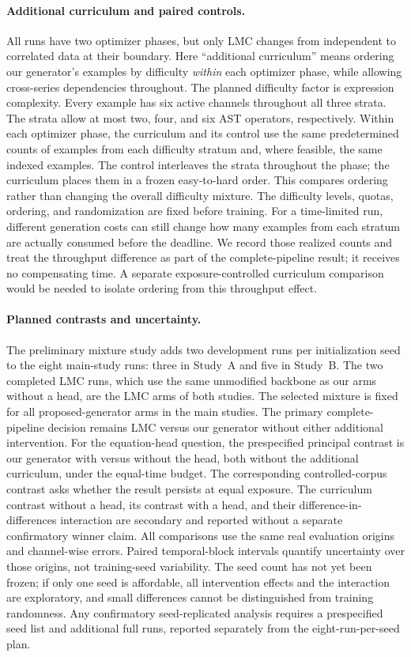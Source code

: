 \paragraph{Additional curriculum and paired controls.}
All runs have two optimizer phases, but only LMC changes from independent to
correlated data at their boundary. Here ``additional curriculum'' means
ordering our generator's examples by difficulty \emph{within} each optimizer
phase, while allowing cross-series dependencies throughout. The planned
difficulty factor is expression complexity. Every example has six active
channels throughout all three strata. The strata allow at most two, four,
and six AST operators, respectively.
Within each optimizer phase, the curriculum and its control use the same predetermined
counts of examples from each difficulty stratum and, where feasible, the same
indexed examples. The control interleaves the strata throughout the phase;
the curriculum places them in a frozen easy-to-hard order. This compares
ordering rather than changing the overall difficulty mixture. The difficulty
levels, quotas, ordering, and randomization are fixed before training.
For a time-limited run, different generation costs can still change how many
examples from each stratum are actually consumed before the deadline. We
record those realized counts and treat the throughput difference as part of
the complete-pipeline result; it receives no compensating time. A separate
exposure-controlled curriculum comparison would be needed to isolate ordering
from this throughput effect.

\paragraph{Planned contrasts and uncertainty.}
The preliminary mixture study adds two development runs per initialization
seed to the eight main-study runs: three in Study~A and five in Study~B. The
two completed LMC runs, which use the same unmodified backbone as our arms
without a head, are the LMC arms of both studies.
The selected mixture is fixed for all proposed-generator arms in the main
studies. The
primary complete-pipeline decision remains LMC versus our generator without
either additional intervention. For the equation-head question, the
prespecified principal contrast is our generator with versus without the head,
both without the additional curriculum, under the equal-time budget. The
corresponding controlled-corpus contrast asks whether the result persists at
equal exposure. The curriculum contrast without a head, its contrast with a
head, and their difference-in-differences interaction are secondary and
reported without a separate confirmatory winner claim. All comparisons use
the same real evaluation origins and channel-wise errors. Paired temporal-block
intervals quantify uncertainty over those origins, not training-seed
variability. The seed count has not yet been frozen; if only one seed is
affordable, all intervention effects and the interaction are exploratory, and
small differences cannot be distinguished from training randomness. Any
confirmatory seed-replicated analysis requires a prespecified seed list and
additional full runs, reported separately from the eight-run-per-seed plan.

